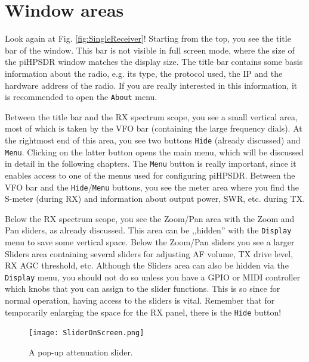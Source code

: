 \documentclass[12pt]{book}
\def\rett#1{\texttt{\color{red}#1}}
\def\bltt#1{\texttt{\color{blue}#1}}
\def\pH{pi\-HPSDR\xspace}
\begin{document}
\section{Window areas}

Look again at Fig. \ref{fig:SingleReceiver}! Starting from the
top, you see the title bar of the window. This bar is not visible
in full screen mode, where the size of the \pH window matches
the display size. The title bar contains some basis information
about the radio, e.g.  its type, the protocol used, the  IP
and the hardware address of the radio. If you are really interested
in this information, it is recommended to open the
\bltt{About} menu.

Between the title bar and the RX spectrum scope, you see
a small vertical area, most of  which is taken by the VFO bar
(containing the large frequency dials). At the rightmost
end of this area, you see two buttons \rett{Hide} (already
discussed) and \rett{Menu}. Clicking on the latter button opens
the main menu, which will be discussed in detail in the following
chapters. The \rett{Menu} button is really important, since it
enables access to one of the menus used for configuring \pH.
Between the VFO bar and the \rett{Hide}/\rett{Menu} buttons,
you see the meter area where you find the S-meter (during RX)
and information about output power, SWR, etc. during TX.

Below the RX  spectrum scope, you see the Zoom/Pan area with
the  Zoom and Pan sliders, as already discussed. This area
can be ,,hidden'' with the \bltt{Display} menu to save some
vertical space. Below the
Zoom/Pan sliders you see a larger  Sliders area containing
several sliders for adjusting AF volume, TX  drive level,
RX  AGC threshold, etc. Although the Sliders area can also
be hidden via the \bltt{Display} menu, you should not do so
unless you have a GPIO or MIDI controller which knobs that
you can assign to the slider functions. This is so since
for  normal operation, having access to the sliders is vital.
Remember that for temporarily enlarging the space for
the RX  panel, there is the \rett{Hide} button!

\begin{figure}
\center
\texttt{[image: SliderOnScreen.png]}
\caption{A pop-up attenuation slider.}
\label{fig:SliderOnScreen}
\end{figure}
\end{document}
